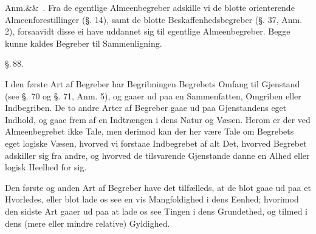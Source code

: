 \documentclass[12pt]{book}
\def\sperr#1{#1}%
\def\textit#1{#1}%
\def\emph#1{#1}%
\newcommand{\sperr}[1]{\textls[180]{#1}}
\newcommand{\parag}[1]{%
  \par\vspace{0.9\baselineskip}%
  {\centering\textit{\S.\,#1.}\par}%
  \vspace{0.35\baselineskip}%
  \noindent\hspace{\parindent}\ignorespaces
}
\newcommand{\anm}[1]{%
  \par\vspace{0.5\baselineskip}%
  \noindent\hspace{\parindent}\sperr{Anm.}\ifx&#1&\else~\textit{#1}.\fi
  \enspace\ignorespaces
}
\newcommand{\opage}[1]{\marginnote{\footnotesize\textit{[#1]}}}
\begin{document}
\anm{} Fra de egentlige Almeenbegreber adskille vi de blotte \emph{orienterende
Almeenforestillinger} (§. 14), samt de blotte \emph{Beskaffenhedsbegreber} (§. 37,
Anm. 2), forsaavidt disse ei have uddannet sig til egentlige Almeenbegreber. Begge kunne
kaldes Begreber til Sammenligning.

\parag{88}

I den første Art af Begreber har Begribningen Begrebets Omfang til Gjenstand (see §. 70
og §. 71, Anm. 5), og gaaer ud paa en Sammenfatten, Omgriben eller Indbegriben. De to
andre Arter af Begreber gaae ud paa Gjenstandens eget Indhold, og gaae frem af en
Indtrængen i dens Natur og Væsen. Herom er der ved Almeenbegrebet ikke Tale, men derimod
kan der her være Tale om Begrebets eget \emph{logiske Væsen}, hvorved vi forstaae
Indbegrebet af alt Det, hvorved Begrebet adskiller sig fra andre, og hvorved de
tilsvarende Gjenstande danne en Alhed eller logisk Heelhed for sig.

Den første og anden Art af Begreber have det tilfælleds, at de blot gaae ud paa et
Hvorledes, eller blot lade os see en vis Mangfoldighed i dens Eenhed; hvorimod den
sidste Art
\opage{231} gaaer ud paa at lade os see Tingen i dens Grundethed, og tilmed i dens (mere eller
mindre relative) Gyldighed.
\end{document}
